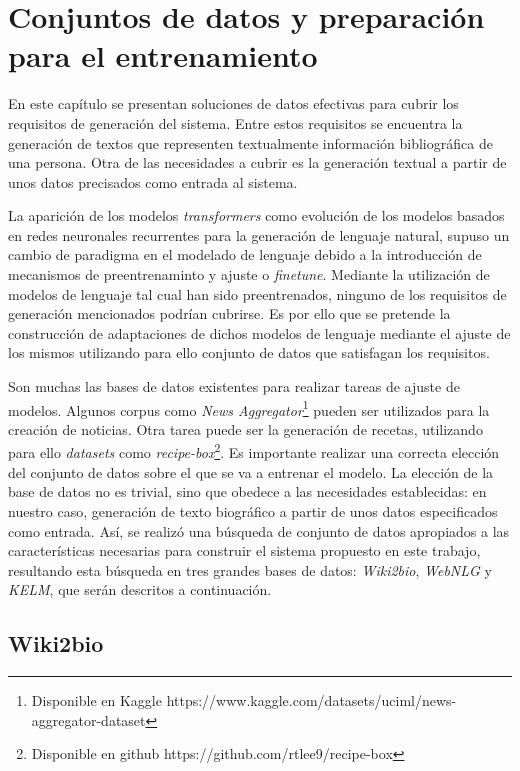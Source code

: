 \chapter{Conjuntos de datos y preparación para el entrenamiento}
\label{cap:ConjuntosDeDatosYPreparacionParaElEntrenamiento}

En este capítulo se presentan soluciones de datos efectivas para cubrir los requisitos de generación del sistema. Entre estos requisitos se encuentra la generación de textos que representen textualmente información bibliográfica de una persona. Otra de las necesidades a cubrir es la generación textual a partir de unos datos precisados como entrada al sistema. 

La aparición de los modelos \textit{transformers} como evolución de los modelos basados en redes neuronales recurrentes para la generación de lenguaje natural, supuso un cambio de paradigma en el modelado de lenguaje debido a la introducción de mecanismos de preentrenaminto y ajuste o \textit{finetune}.
Mediante la utilización de modelos de lenguaje tal cual han sido preentrenados, ninguno de los requisitos de generación mencionados podrían cubrirse. Es por ello que se pretende la construcción de adaptaciones de dichos modelos de lenguaje mediante el ajuste de los mismos utilizando para ello conjunto de datos que satisfagan los requisitos.


Son muchas las bases de datos existentes para realizar tareas de ajuste de modelos. Algunos corpus como \textit{News Aggregator}\footnote{Disponible en Kaggle https://www.kaggle.com/datasets/uciml/news-aggregator-dataset} pueden ser utilizados para la creación de noticias. Otra tarea puede ser la generación de recetas, utilizando para ello \textit{datasets} como \textit{recipe-box}\footnote{Disponible en github https://github.com/rtlee9/recipe-box}.
Es importante realizar una correcta elección del conjunto de datos sobre el que se va a entrenar el modelo. La elección de la base de datos no es trivial, sino que obedece a las necesidades establecidas: en nuestro caso, generación de texto biográfico a partir de unos datos especificados como entrada. 
Así, se realizó una búsqueda de conjunto de datos apropiados a las características necesarias para construir el sistema propuesto en este trabajo, resultando esta búsqueda en tres grandes bases de datos: \textit{Wiki2bio}, \textit{WebNLG} y \textit{KELM}, que serán descritos a continuación.



\section{Wiki2bio}

